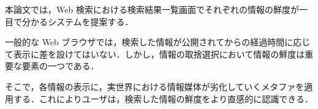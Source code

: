 


\begin{jabstract}

本論文では，Web 検索における検索結果一覧画面でそれぞれの情報の鮮度が一目で分かるシステムを提案する．

一般的な Web ブラウザでは，検索した情報が公開されてからの経過時間に応じて表示に差を設けてはいない．しかし，情報の取捨選択において情報の鮮度は重要な要素の一つである．

そこで，各情報の表示に，実世界における情報媒体が劣化していくメタファを適用する．これによりユーザは，検索した情報の鮮度をより直感的に認識できる．

\end{jabstract}
